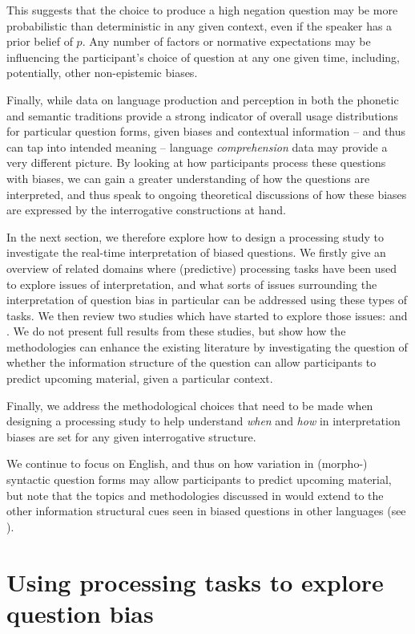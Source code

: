 \documentclass[output=paper,colorlinks,citecolor=brown]{langscibook}
\begin{document}
This suggests that the choice to produce a high negation question may be more probabilistic than deterministic in any given context, even if the speaker has a prior belief of $p$. Any number of factors or normative expectations may be influencing the participant's choice of question at any one given time, including, potentially, other non-epistemic biases.

Finally, while data on language production and perception in both the phonetic and semantic traditions provide a strong indicator of overall usage distributions for particular question forms, given biases and contextual information  --  and thus can tap into intended meaning  --  language \textit{comprehension} data may provide a very different picture. By looking at how participants process these questions with biases, we can gain a greater understanding of how the questions are interpreted, and thus speak to ongoing theoretical discussions of how these biases are expressed by the interrogative constructions at hand.

In the next section, we therefore explore how to design a processing study to investigate the real-time interpretation of biased questions. We firstly give an overview of related domains where (predictive) processing tasks have been used to explore issues of interpretation, and what sorts of issues surrounding the interpretation of question bias in particular can be addressed using these types of tasks. We then review two studies which have started to explore those issues: \citet{tian_representing_2021} and \citet{macuch_processing_inprep}. We do not present full results from these studies, but show how the methodologies can enhance the existing literature by investigating the question of whether the information structure of the question can allow participants to predict upcoming material, given a particular context. 

Finally, we address the methodological choices that need to be made when designing a processing study to help understand \textit{when} and \textit{how} in interpretation biases are set for any given interrogative structure.

We continue to focus on English, and thus on how variation in (morpho-) syntactic question forms may allow participants to predict upcoming material, but note that the topics and methodologies discussed in  would extend to the other information structural cues seen in biased questions in other languages (see ).


\section{Using processing tasks to explore question bias} \label{sec3}
\end{document}
